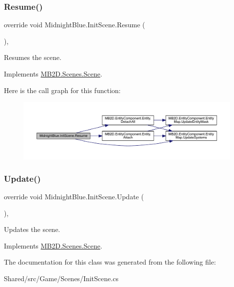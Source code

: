 \subsubsection{\texorpdfstring{Resume()}{Resume()}}
{\footnotesize\ttfamily override void Midnight\+Blue.\+Init\+Scene.\+Resume (\begin{DoxyParamCaption}{ }\end{DoxyParamCaption})\hspace{0.3cm}{\ttfamily [inline]}, {\ttfamily [virtual]}}



Resumes the scene. 



Implements \hyperlink{class_m_b2_d_1_1_scenes_1_1_scene_ad13639db22b059a1b714eefd9d927735}{M\+B2\+D.\+Scenes.\+Scene}.

Here is the call graph for this function\+:
\nopagebreak
\begin{figure}[H]
\begin{center}
\leavevmode
\includegraphics[width=350pt]{class_midnight_blue_1_1_init_scene_a01ade76252a492d20181bd2e00eb217f_cgraph}
\end{center}
\end{figure}
\hypertarget{class_midnight_blue_1_1_init_scene_ad87861fb4f2a30f5168f6133aa10d3f4}{}\label{class_midnight_blue_1_1_init_scene_ad87861fb4f2a30f5168f6133aa10d3f4} 
\subsubsection{\texorpdfstring{Update()}{Update()}}
{\footnotesize\ttfamily override void Midnight\+Blue.\+Init\+Scene.\+Update (\begin{DoxyParamCaption}{ }\end{DoxyParamCaption})\hspace{0.3cm}{\ttfamily [inline]}, {\ttfamily [virtual]}}



Updates the scene. 



Implements \hyperlink{class_m_b2_d_1_1_scenes_1_1_scene_a779de7c1ab23b698dcde3a228324a991}{M\+B2\+D.\+Scenes.\+Scene}.



The documentation for this class was generated from the following file\+:\begin{DoxyCompactItemize}
\item 
Shared/src/\+Game/\+Scenes/Init\+Scene.\+cs\end{DoxyCompactItemize}
